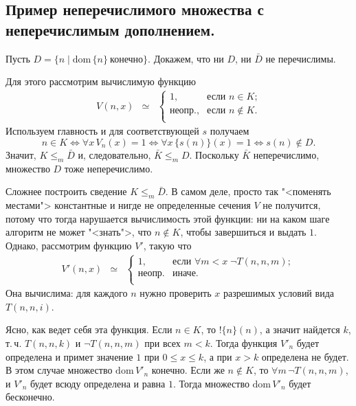 \documentclass[a4paper, 10pt]{article}
\newcommand{\bang}{\mathop !}
\newcommand{\dom}{\text{dom}\,}
\begin{document}
\subsection{Пример неперечислимого множества с неперечислимым дополнением.}

Пусть $D = \{n \mid \dom \{n\}\ \mbox{конечно}\}$. Докажем, что ни $D$, ни $\bar D$ не перечислимы.

Для этого рассмотрим вычислимую функцию
$$\begin{array}{rcl}
V(n, x)&\simeq&\begin{cases}
                  1,&\text{если $n \in K$;}\\
		 \mbox{неопр.},&\text{если $n \notin K$}.\\
		  \end{cases}
\end{array}$$
Используем главность и для соответствующей $s$ получаем
$$n \in K \iff \forall x\, V_n(x) = 1 \iff \forall x\, \{s(n)\}(x) = 1 \iff s(n) \notin D.$$
Значит, $K \leq_m \bar D$ и, следовательно, $\bar K \leq_m  D$. Поскольку $\bar K$ неперечислимо, множество $D$ тоже неперечислимо.

Сложнее построить сведение $K \leq_m \bar D$. В самом деле, просто так "<поменять местами"> константные и нигде не определенные сечения $V$ не получится, потому что тогда нарушается вычислимость этой функции: ни на каком шаге алгоритм не может "<знать">, что $n \notin K$, чтобы завершиться и выдать $1$. Однако, рассмотрим функцию $V'$, такую что
$$\begin{array}{rcl}
V'(n, x)&\simeq&\begin{cases}
                  1,&\text{если }\forall m < x\; \neg T(n, n, m);\\
		 \mbox{неопр.}&\text{иначе}.\\
		  \end{cases}
\end{array}$$
Она вычислима: для каждого $n$ нужно проверить $x$ разрешимых условий вида $T(n, n, i)$. 

Ясно, как ведет себя эта функция. Если $n \in K$, то $\bang\{n\}(n)$, а значит найдется $k$, т.\,ч. $T(n, n, k)$ и $\neg T(n,n,m)$ при всех $m < k$. Тогда функция $V'_n$ будет определена и примет значение $1$ при $0 \leqslant x \leqslant k$, а при $x > k$ определена не будет. В этом случае множество $\dom V'_n$ конечно. Если же $n \notin K$,  то $\forall m\, \neg T (n, n, m)$, и $V'_n$ будет всюду определена и равна $1$. Тогда множество $\dom V'_n$ будет бесконечно.
\end{document}
